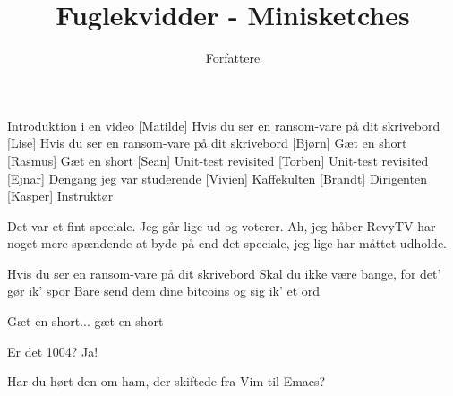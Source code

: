 \documentclass[a4paper,11pt]{article}
\title{Fuglekvidder - Minisketches}
\author{Forfattere}
\begin{document}
\maketitle

\begin{roles}
   Introduktion i en video
  [Matilde] Hvis du ser en ransom-vare på dit skrivebord
  [Lise] Hvis du ser en ransom-vare på dit skrivebord
  [Bjørn] Gæt en short
  [Rasmus] Gæt en short
  [Sean] Unit-test revisited
  [Torben] Unit-test revisited
  [Ejnar] Dengang jeg var studerende
  [Vivien] Kaffekulten
  [Brandt] Dirigenten
  [Kasper] Instruktør
\end{roles}


\begin{sketch}
   Det var et fint speciale. Jeg går lige ud og voterer.
   Ah, jeg håber RevyTV har noget mere spændende at byde på end det speciale, jeg lige har måttet udholde.
  
\end{sketch}
\begin{song}
  Hvis du ser en ransom-vare på dit skrivebord
  Skal du ikke være bange, for det' gør ik' spor
  Bare send dem dine bitcoins og sig ik' et ord
\end{song}
\begin{song}
   Gæt en short... gæt en short
\end{song}
\begin{sketch}
   Er det 1004?
   Ja!
\end{sketch}
\begin{sketch}
   Har du hørt den om ham, der skiftede fra Vim til Emacs?
\end{sketch}
\end{document}

